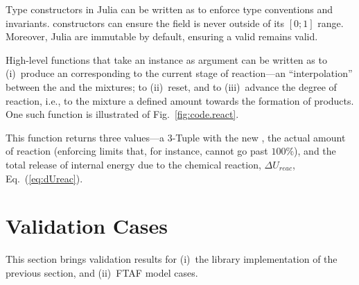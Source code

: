     Type constructors in Julia can be written as to enforce type conventions and invariants.  constructors can ensure the  field is never outside of its $[0;  1]$  range.
    Moreover, Julia  are immutable by default, ensuring a valid  remains valid.

    High-level functions that take an  instance as argument can be written as to (i)~produce an  corresponding to the current stage  of  reaction---an  ``interpolation''
    between the  and the  mixtures; to (ii)~reset, and to (iii)~advance the degree of reaction, i.e., to  the mixture a defined amount towards  the  formation
    of products. One such function is illustrated of Fig.~\ref{fig:code.react}.


    This function returns three values---a 3-Tuple with the new , the actual amount of reaction (enforcing  limits that, for instance, cannot go past  $100\%$),  and  the
    total release of internal energy due to the chemical reaction, $\Delta{U_{reac}}$, Eq.~(\ref{eq:dUreac}).



\section{Validation Cases}

    This section brings validation results for (i)~the library implementation of the previous section, and (ii)~FTAF model cases.


